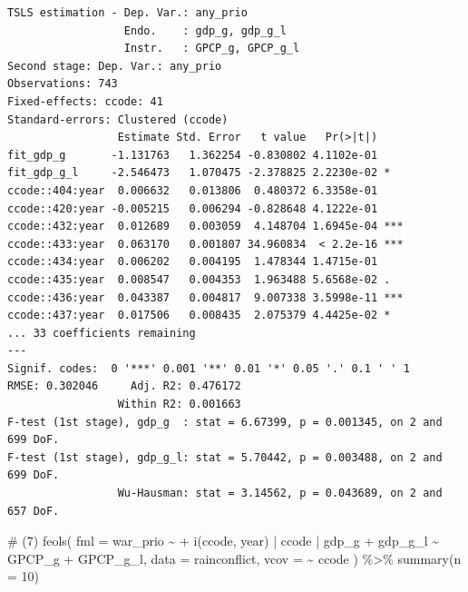 \documentclass[
  a4paper,
  DIV=11,
  oneside]{scrreprt}
\newenvironment{Shaded}{\begin{snugshade}}{\end{snugshade}}
\newcommand{\AttributeTok}[1]{\textcolor[rgb]{0.40,0.45,0.13}{#1}}
\newcommand{\CommentTok}[1]{\textcolor[rgb]{0.37,0.37,0.37}{#1}}
\newcommand{\DecValTok}[1]{\textcolor[rgb]{0.68,0.00,0.00}{#1}}
\newcommand{\FunctionTok}[1]{\textcolor[rgb]{0.28,0.35,0.67}{#1}}
\newcommand{\NormalTok}[1]{\textcolor[rgb]{0.00,0.23,0.31}{#1}}
\newcommand{\SpecialCharTok}[1]{\textcolor[rgb]{0.37,0.37,0.37}{#1}}
\begin{document}
\begin{verbatim}
TSLS estimation - Dep. Var.: any_prio
                  Endo.    : gdp_g, gdp_g_l
                  Instr.   : GPCP_g, GPCP_g_l
Second stage: Dep. Var.: any_prio
Observations: 743
Fixed-effects: ccode: 41
Standard-errors: Clustered (ccode) 
                 Estimate Std. Error   t value   Pr(>|t|)    
fit_gdp_g       -1.131763   1.362254 -0.830802 4.1102e-01    
fit_gdp_g_l     -2.546473   1.070475 -2.378825 2.2230e-02 *  
ccode::404:year  0.006632   0.013806  0.480372 6.3358e-01    
ccode::420:year -0.005215   0.006294 -0.828648 4.1222e-01    
ccode::432:year  0.012689   0.003059  4.148704 1.6945e-04 ***
ccode::433:year  0.063170   0.001807 34.960834  < 2.2e-16 ***
ccode::434:year  0.006202   0.004195  1.478344 1.4715e-01    
ccode::435:year  0.008547   0.004353  1.963488 5.6568e-02 .  
ccode::436:year  0.043387   0.004817  9.007338 3.5998e-11 ***
ccode::437:year  0.017506   0.008435  2.075379 4.4425e-02 *  
... 33 coefficients remaining
---
Signif. codes:  0 '***' 0.001 '**' 0.01 '*' 0.05 '.' 0.1 ' ' 1
RMSE: 0.302046     Adj. R2: 0.476172
                 Within R2: 0.001663
F-test (1st stage), gdp_g  : stat = 6.67399, p = 0.001345, on 2 and 699 DoF.
F-test (1st stage), gdp_g_l: stat = 5.70442, p = 0.003488, on 2 and 699 DoF.
                 Wu-Hausman: stat = 3.14562, p = 0.043689, on 2 and 657 DoF.
\end{verbatim}

\begin{Shaded}
\begin{Highlighting}[]
\CommentTok{\# (7)}
\FunctionTok{feols}\NormalTok{(}
  \AttributeTok{fml =}\NormalTok{ war\_prio }\SpecialCharTok{\textasciitilde{}} 
    \SpecialCharTok{+} \FunctionTok{i}\NormalTok{(ccode, year)}
  \SpecialCharTok{|}\NormalTok{ ccode}
  \SpecialCharTok{|}\NormalTok{ gdp\_g }\SpecialCharTok{+}\NormalTok{ gdp\_g\_l }\SpecialCharTok{\textasciitilde{}}\NormalTok{ GPCP\_g }\SpecialCharTok{+}\NormalTok{ GPCP\_g\_l, }
  \AttributeTok{data =}\NormalTok{ rainconflict,}
  \AttributeTok{vcov =} \SpecialCharTok{\textasciitilde{}}\NormalTok{ ccode}
\NormalTok{) }\SpecialCharTok{\%\textgreater{}\%} 
  \FunctionTok{summary}\NormalTok{(}\AttributeTok{n =} \DecValTok{10}\NormalTok{)}
\end{Highlighting}
\end{Shaded}
\end{document}
